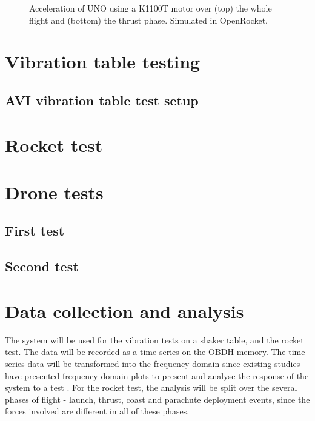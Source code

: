 \documentclass[a4paper,11pt]{article}
\begin{document}
\begin{figure}[H]
  
  
  \label{fig:openrocket-k-acceleration}
  \caption{Acceleration of UNO using a K1100T motor over (top) the whole flight and (bottom) the thrust phase. Simulated in OpenRocket.}
\end{figure}



\section{Vibration table testing}
\subsection{AVI vibration table test setup}



\section{Rocket test}


\section{Drone tests}
\subsection{First test}
\subsection{Second test}


\section{Data collection and analysis}

The system will be used for the vibration tests on a shaker table, and the rocket test. The data will be recorded as a time series on the OBDH memory. The time series data will be transformed into the frequency domain since existing studies have presented frequency domain plots to present and analyse the response of the system to a test \cite{nasa-pyroshock,nieto2019cubesat}. For the rocket test, the analysis will be split over the several phases of flight - launch, thrust, coast and parachute deployment events, since the forces involved are different in all of these phases.
\end{document}
